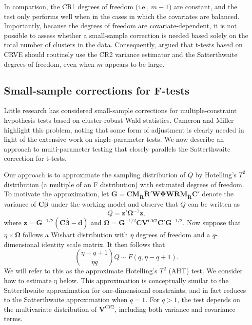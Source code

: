 \documentclass[12pt]{article}
\newcommand{\bm}{\mathbf}
\newcommand{\bs}{\boldsymbol}
\begin{document}
In comparison, the CR1 degrees of freedom (i.e., $m - 1$) are constant, and the test only performs well when in the cases in which the covariates are balanced.
Importantly, because the degrees of freedom are covariate-dependent, it is not possible to assess whether a small-sample correction is needed based solely on the total number of clusters in the data. 
Consequently, \citet{Tipton2015small-t} argued that t-tests based on CRVE should routinely use the CR2 variance estimator and the Satterthwaite degrees of freedom, even when $m$ appears to be large.


\subsection{Small-sample corrections for F-tests}
\label{subsec:F-tests}

Little research has considered small-sample corrections for multiple-constraint hypothesis tests based on cluster-robust Wald statistics.
Cameron and Miller highlight this problem, noting that some form of adjustment is clearly needed in light of the extensive work on single-parameter tests.
We now describe an approach to multi-parameter testing that closely parallels the Satterthwaite correction for t-tests.

Our approach is to approximate the sampling distribution of $Q$ by Hotelling's $T^2$ distribution (a multiple of an F distribution) with estimated degrees of freedom. To motivate the approximation, let $\bm{G} = \bm{C} \bm{M_{\ddot{R}}}\bm{\ddot{R}}'\bm{W}\bs\Phi\bm{W}\bm{\ddot{R}}\bm{M_{\ddot{R}}} \bm{C}'$ denote the variance of $\bm{C}\bs{\hat\beta}$ under the working model and observe that $Q$ can be written as \[
Q = \bm{z}' \bs\Omega^{-1} \bm{z},
\]
where $\bm{z} = \bm{G}^{-1/2}\left(\bm{C}\bs{\hat\beta} - \bm{d}\right)$ and $\bs\Omega = \bm{G}^{-1/2} \bm{C} \bm{V}^{CR2}\bm{C}'\bm{G}^{-1/2}$. 
Now suppose that $\eta \times \bs\Omega$ follows a Wishart distribution with $\eta$ degrees of freedom and a $q$-dimensional identity scale matrix. It then follows that
\begin{equation}
\label{eq:AHT}
\left(\frac{\eta - q + 1}{\eta q}\right) Q \ \dot\sim \ F(q, \eta - q + 1).
\end{equation}
We will refer to this as the approximate Hotelling's $T^2$ (AHT) test.
We consider how to estimate $\eta$ below.
This approximation is conceptually similar to the Satterthwaite approximation for one-dimensional constraints, and in fact reduces to the Satterthwaite approximation when $q = 1$. 
For $q > 1$, the test depends on the multivariate distribution of $\bm{V}^{CR2}$, including both variance and covariance terms. 
\end{document}
